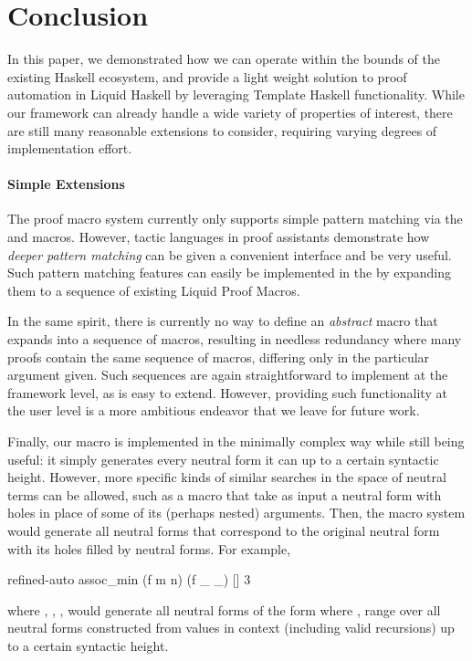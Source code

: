 \section{Conclusion}
\label{sec:future}

In this paper, we demonstrated how we can operate within the bounds of
the existing Haskell ecosystem, and provide a light weight solution to
proof automation in Liquid Haskell by leveraging Template Haskell
functionality. While our framework can already handle a wide variety
of properties of interest, there are still many reasonable extensions
to consider, requiring varying degrees of implementation effort.


\paragraph{Simple Extensions}

The proof macro system currently only supports simple pattern matching
via the  and  macros. However, tactic
languages in proof assistants demonstrate how {\em deeper pattern
  matching} can be given a convenient interface and be very
useful. Such pattern matching features can easily be implemented in
the \LangA by expanding them to a sequence of existing Liquid Proof Macros.

In the same spirit, there is currently no way to define an
\textit{abstract} macro that expands into a sequence of macros,
resulting in needless redundancy where many proofs contain the same
sequence of macros, differing only in the particular argument given.
Such sequences are again straightforward to implement at the framework
level, as \LangA is easy to extend. However, providing such
functionality at the user level is a more ambitious endeavor that we
leave for future work.

Finally, our  macro is implemented in the minimally complex way
while still being useful: it simply generates every neutral form it can up
to a certain syntactic height.  However, more specific kinds of
similar searches in the space of neutral terms can be allowed, such as
a  macro that take as input a neutral form with holes
in place of some of its (perhaps nested) arguments. Then, the macro
system would generate all neutral forms that correspond to the
original neutral form with its holes filled by neutral forms. For
example,
\begin{code}
  refined-auto {assoc_min (f m n) (f _ _)} [] 3
\end{code}
where , , ,
would generate all neutral forms of the form  where 
,  range over all neutral forms constructed from values in
context (including valid recursions) up to a certain syntactic height.

